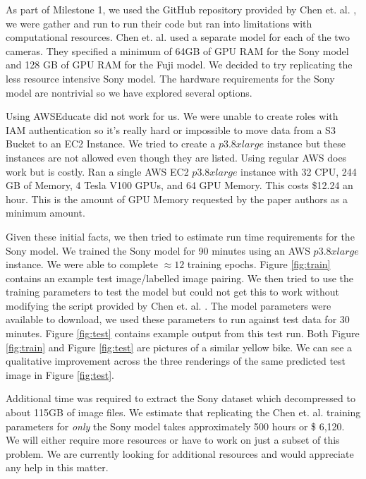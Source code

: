 \documentclass{article}
\begin{document}
As part of Milestone 1, we used the GitHub repository provided by Chen et.
al. \cite{chen2018learning},
we were gather and run to run their code but ran into limitations with computational
resources. Chen et. al. \cite{chen2018learning} used a separate model for
each of the two cameras. They specified a minimum of 64GB of GPU RAM for the
Sony model and 128 GB of GPU RAM for the Fuji model. We decided to try
replicating the less resource intensive Sony model. The hardware
requirements for the Sony model are nontrivial so we have explored
several options.\newline

Using AWSEducate did not work for us. We were unable to create roles with
IAM authentication so it's really hard or impossible to move data from a
S3 Bucket to an EC2 Instance. We tried to create a $p3.8xlarge$ instance but
these instances are not allowed even though they are listed. Using regular
AWS does work but is costly. Ran a single AWS EC2 $p3.8xlarge$ instance
with 32 CPU, 244 GB of Memory, 4 Tesla V100 GPUs, and 64 GPU Memory. This
costs \$12.24 an hour. This is the amount of GPU Memory requested by the
paper authors as a minimum amount. \newline

Given these initial facts, we then tried to estimate run time requirements
for the Sony model. We trained the Sony model for 90 minutes using an
AWS $p3.8xlarge$ instance. We were able to complete $\approx 12$ training
epochs. Figure \ref{fig:train} contains an example test image/labelled image
pairing. We then tried to use the training parameters to
test the model but could not get this to work without modifying the script
provided by Chen et. al. \cite{chen2018learning}. The model parameters
were available to download, we used these parameters to run against test
data for 30 minutes. Figure \ref{fig:test} contains example output from this
test run. Both Figure \ref{fig:train} and Figure \ref{fig:test}
are pictures of a similar yellow bike. We can see a qualitative improvement
across the three renderings of the same predicted test image in
Figure \ref{fig:test}.

Additional time was required to extract the Sony dataset
which decompressed to about 115GB of image files. We estimate that
replicating the Chen et. al. \cite{chen2018learning} training parameters
for \textit{only} the Sony model takes approximately 500 hours or
\$ 6,120. We will either require more resources or have to work on just a
subset of this problem. We are currently looking for additional resources
and would appreciate any help in this matter.
\end{document}
